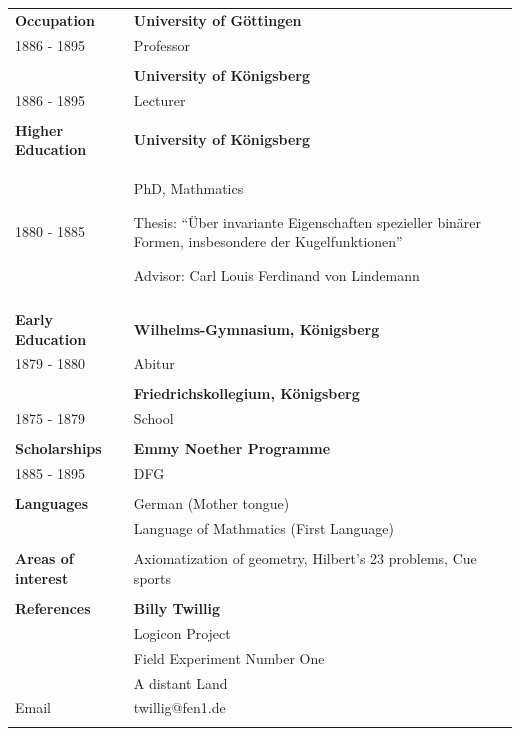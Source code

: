 \documentclass[12pt, a4paper]{article}
\begin{document}
\begin{longtable}{@{} p{} >{\RaggedRight}p{}}
  \textcolor{midblue}{\textbf{Occupation}}
  & \textbf{University of Göttingen} \\
  1886 - 1895
  & Professor \\
  & \\

  & \textbf{University of Königsberg} \\
  1886 - 1895
  & Lecturer \\
  & \\


  \textcolor{midblue}{\textbf{Higher Education}}
  & \textbf{University of Königsberg} \\
  1880 - 1885
  & PhD, Mathmatics  

  Thesis: ``Über invariante Eigenschaften spezieller
  binärer Formen, insbesondere der Kugelfunktionen''

  Advisor: Carl Louis Ferdinand von Lindemann \\
  & \\


  \textcolor{midblue}{\textbf{Early Education}}
  & \textbf{Wilhelms-Gymnasium, Königsberg} \\
  1879 - 1880
  & Abitur \\
  & \\

  & \textbf{Friedrichskollegium, Königsberg} \\
  1875 - 1879 
  & School \\
  & \\


  \textcolor{midblue}{\textbf{Scholarships}}
  & \textbf{Emmy Noether Programme} \\
  1885 - 1895
  & DFG \\
  & \\


  \textcolor{midblue}{\textbf{Languages}}
  & German (Mother tongue) \\
  & Language of Mathmatics (First Language) \\
  & \\


  \textcolor{midblue}{\textbf{Areas of interest}}
  & Axiomatization of geometry, Hilbert's 23 problems,
  Cue sports \\
  & \\

  \newpage

  \textcolor{midblue}{\textbf{References}}
  & \textbf{Billy Twillig} \\
  & Logicon Project \\
  & Field Experiment Number One \\
  & A distant Land \\
  Email
  & twillig@fen1.de \\
  & \\

\end{longtable}
\end{document}
